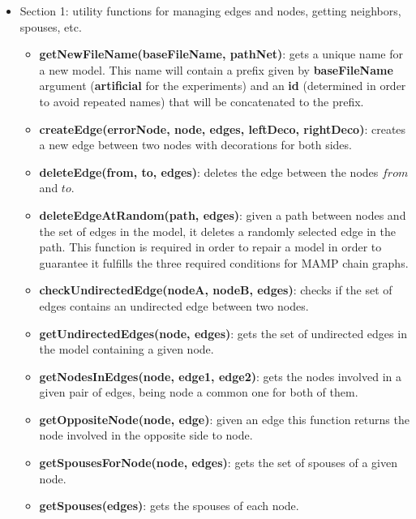 \documentclass[11pt,professionalfont]{article}
\begin{document}
\begin{itemize}
\item Section 1: utility functions for managing edges and nodes, 
getting neighbors, spouses, etc.

  \begin{itemize}
	\item \textbf{getNewFileName(baseFileName, pathNet)}: gets a unique name
	for a new model. This name will contain a prefix given by \textbf{baseFileName} 
	argument (\textbf{artificial} for the experiments) and an \textbf{id} (determined
	in order to avoid repeated names) that will be concatenated to the prefix.

	\item \textbf{createEdge(errorNode, node, edges, leftDeco, rightDeco)}: creates
			a new edge between two nodes with decorations for both sides. 

	\item \textbf{deleteEdge(from, to, edges)}: deletes the edge between the nodes
			$from$ and $to$.

	\item \textbf{deleteEdgeAtRandom(path, edges)}: given a path between nodes
			and the set of edges in the model, it deletes a randomly selected 
			edge in the path. This function is required in order to repair a 
			model in order to guarantee it fulfills the three required conditions 
			for MAMP chain graphs.

	\item \textbf{checkUndirectedEdge(nodeA, nodeB, edges)}: checks if the set
			of edges contains an undirected edge between two nodes.

	\item \textbf{getUndirectedEdges(node, edges)}: gets the set of undirected
			edges in the model containing a given node.

	\item \textbf{getNodesInEdges(node, edge1, edge2)}: gets the nodes involved
			in a given pair of edges, being node a common one for both of them.

	\item \textbf{getOppositeNode(node, edge)}: given an edge this function 
			returns the node involved in the opposite side to node.

	\item \textbf{getSpousesForNode(node, edges)}: gets the set of spouses of
			a given node.

	\item \textbf{getSpouses(edges)}: gets the spouses of each node.


\end{itemize}
\end{itemize}
\end{document}
